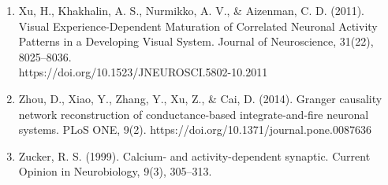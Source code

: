 \documentclass[11pt]{article}
\begin{document}
\begin{enumerate}
\item Xu, H., Khakhalin, A. S., Nurmikko, A. V., \& Aizenman, C. D. (2011). Visual Experience-Dependent Maturation of Correlated Neuronal Activity Patterns in a Developing Visual System. Journal of Neuroscience, 31(22), 8025–8036.\\ https://doi.org/10.1523/JNEUROSCI.5802-10.2011
\item Zhou, D., Xiao, Y., Zhang, Y., Xu, Z., \& Cai, D. (2014). Granger causality network reconstruction of conductance-based integrate-and-fire neuronal systems. PLoS ONE, 9(2). https://doi.org/10.1371/journal.pone.0087636
\item Zucker, R. S. (1999). Calcium- and activity-dependent synaptic. Current Opinion in Neurobiology, 9(3), 305–313.
\end{enumerate}
\end{document}
